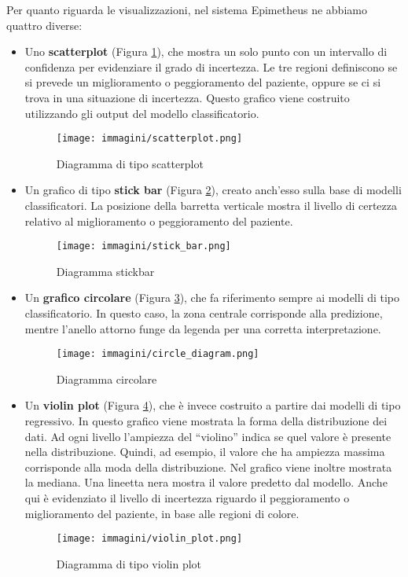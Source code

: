 Per quanto riguarda le visualizzazioni, nel sistema Epimetheus ne abbiamo quattro diverse:
\begin{itemize}
    \item Uno \textbf{scatterplot} (Figura \ref{fig:scatterplot}), che mostra un solo punto con un intervallo di confidenza per evidenziare il grado di incertezza. Le tre regioni definiscono se si prevede un miglioramento o peggioramento del paziente, oppure se ci si trova in una situazione di incertezza. Questo grafico viene costruito utilizzando gli output del modello classificatorio.

\begin{figure}
    \centering
    \texttt{[image: immagini/scatterplot.png]}
    \caption{ Diagramma di tipo scatterplot}
    \label{fig:scatterplot}
\end{figure}
    
    \item  Un grafico di tipo \textbf{stick bar} (Figura \ref{fig:stickbar}), creato anch’esso sulla base di modelli classificatori. La posizione della barretta verticale mostra il livello di certezza relativo al miglioramento o peggioramento del paziente.

\begin{figure}
    \centering
    \texttt{[image: immagini/stick\_bar.png]}
    \caption{Diagramma stickbar}
    \label{fig:stickbar}
\end{figure}
    
    \item Un \textbf{grafico circolare} (Figura \ref{fig:diagrammaCircolare}), che fa riferimento sempre ai modelli di tipo classificatorio. In questo caso, la zona centrale corrisponde alla predizione, mentre l'anello attorno funge da legenda per una corretta interpretazione.

\begin{figure}
    \centering
    \texttt{[image: immagini/circle\_diagram.png]}
    \caption{Diagramma circolare}
    \label{fig:diagrammaCircolare}
\end{figure}
    
    \item Un \textbf{violin plot} (Figura \ref{fig:violinPlot}), che è invece costruito a partire dai modelli di tipo regressivo. In questo grafico viene mostrata la forma della distribuzione dei dati. Ad ogni livello l'ampiezza del “violino” indica se quel valore è presente nella distribuzione. Quindi, ad esempio, il valore che ha ampiezza massima corrisponde alla moda della distribuzione. Nel grafico viene inoltre mostrata la mediana. Una lineetta nera mostra il valore predetto dal modello. Anche qui è evidenziato il livello di incertezza riguardo il peggioramento o miglioramento del paziente, in base alle regioni di colore.

\begin{figure}
    \centering
    \texttt{[image: immagini/violin\_plot.png]}
    \caption{Diagramma di tipo violin plot}
    \label{fig:violinPlot}
\end{figure}
    
\end{itemize}


